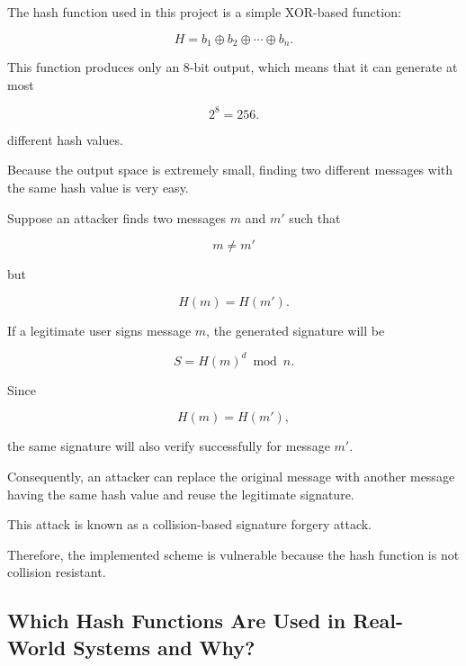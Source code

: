 \documentclass[12pt]{article}
\begin{document}
The hash function used in this project is a simple XOR-based function:

\begin{equation}
H = b_1 \oplus b_2 \oplus \cdots \oplus b_n.
\end{equation}

This function produces only an 8-bit output, which means that it can generate
at most

\begin{equation}
2^8 = 256.
\end{equation}

different hash values.

Because the output space is extremely small, finding two different messages
with the same hash value is very easy.

Suppose an attacker finds two messages $m$ and $m'$ such that

\begin{equation}
m \neq m'
\end{equation}

but

\begin{equation}
H(m)=H(m').
\end{equation}

If a legitimate user signs message $m$, the generated signature will be

\begin{equation}
S = H(m)^d \bmod n.
\end{equation}

Since

\begin{equation}
H(m)=H(m'),
\end{equation}

the same signature will also verify successfully for message $m'$.

Consequently, an attacker can replace the original message with another
message having the same hash value and reuse the legitimate signature.

This attack is known as a collision-based signature forgery attack.

Therefore, the implemented scheme is vulnerable because the hash function is
not collision resistant.


\subsection{Which Hash Functions Are Used in Real-World Systems and Why?}
\end{document}
